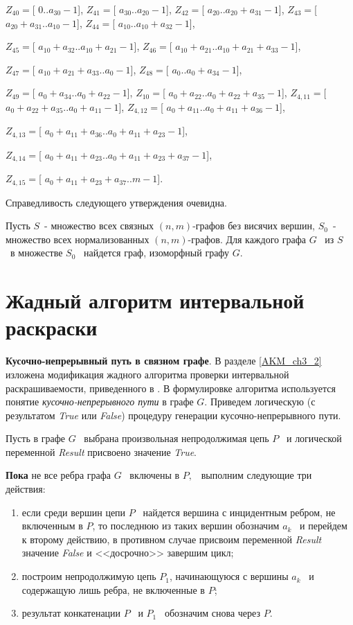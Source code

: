 $Z_{40}=$[ $0..a_{30}-1$],  $Z_{41}=$[ $a_{30}..a_{20}-1$],  $Z_{42}=$[ $a_{20}..a_{20}+a_{31}-1$],  $Z_{43}=$[
$a_{20}+a_{31}..a_{10}-1$],  $Z_{44}=$[ $a_{10}..a_{10}+a_{32}-1$],

$Z_{45}=$[ $a_{10}+a_{32}..a_{10}+a_{21}-1$],  $Z_{46}=$[ $a_{10}+a_{21}..a_{10}+a_{21}+a_{33}-1$],

$Z_{47}=$[ $a_{10}+a_{21}+a_{33}..a_0-1$],  $Z_{48}=$[ $a_0..a_0+a_{34}-1$],

$Z_{49}=$[ $a_0+a_{34}..a_0+a_{22}-1$],  $Z_{10}=$[ $a_0+a_{22}..a_0+a_{22}+a_{35}-1$],  $Z_{4,11}=$[
$a_0+a_{22}+a_{35}..a_0+a_{11}-1$],  $Z_{4,12}=$[  $a_0+a_{11}..a_0+a_{11}+a_{36}-1$],

$Z_{4,13}=$[ $a_0+a_{11}+a_{36}..a_0+a_{11}+a_{23}-1$],

$Z_{4,14}=$[ $a_0+a_{11}+a_{23}..a_0+a_{11}+a_{23}+a_{37}-1$],

$Z_{4,15}=$[ $a_0+a_{11}+a_{23}+a_{37}..m-1$].

Справедливость следующего утверждения очевидна.

\begin{statement}\label{AKM_ch1_s6}
	Пусть  $S$\ - множество всех связных $(n,m)$-графов без висячих вершин,  $S_0$\ - множество всех
	нормализованных $(n,m)$-графов. Для каждого графа  $G$ \ из  $S$ \ в множестве  $S_0$ \ найдется граф, изоморфный
	графу  $G$.
\end{statement}

\section{Жадный алгоритм интервальной раскраски}\label{AKM_ch1_5}
\hypertarget{Toc503377126}{}\textbf{Кусочно-непрерывный путь в связном графе}. В разделе \ref{AKM_ch3_2} изложена модификация
жадного алгоритма проверки интервальной раскрашиваемости, приведенного в \cite{AKM_ch1_bib10}. В формулировке алгоритма используется
понятие \textit{кусочно-непрерывного пути} в графе  $G$. Приведем логическую (с результатом
\foreignlanguage{english}{\textit{True}} или \foreignlanguage{english}{\textit{False}}) процедуру генерации
кусочно-непрерывного пути.

Пусть в графе  $G$ \ выбрана произвольная непродолжимая цепь  $P$ \ и логической переменной
\foreignlanguage{english}{\textit{Result}} присвоено значение \foreignlanguage{english}{\textit{True}}.

\textbf{Пока} не все ребра графа  $G$ \ включены в  $P,$ \ выполним следующие три действия:
\begin{enumerate}[1)]
  \item
если среди вершин цепи
$P$ \ найдется вершина с инцидентным ребром, не включенным в  $P$, то последнюю из таких вершин обозначим  $a_k$ \ и
перейдем к второму действию, в противном случае присвоим переменной \foreignlanguage{english}{\textit{Result}} значение
\foreignlanguage{english}{\textit{False}} и <<досрочно>> завершим цикл;
  \item
  построим непродолжимую цепь  $P_1$,
начинающуюся с вершины  $a_k$ \ и содержащую лишь ребра, не включенные в  $P$;
  \item
результат конкатенации  $P$ \ и $P_1$ \ обозначим снова через  $P$.
\end{enumerate}


